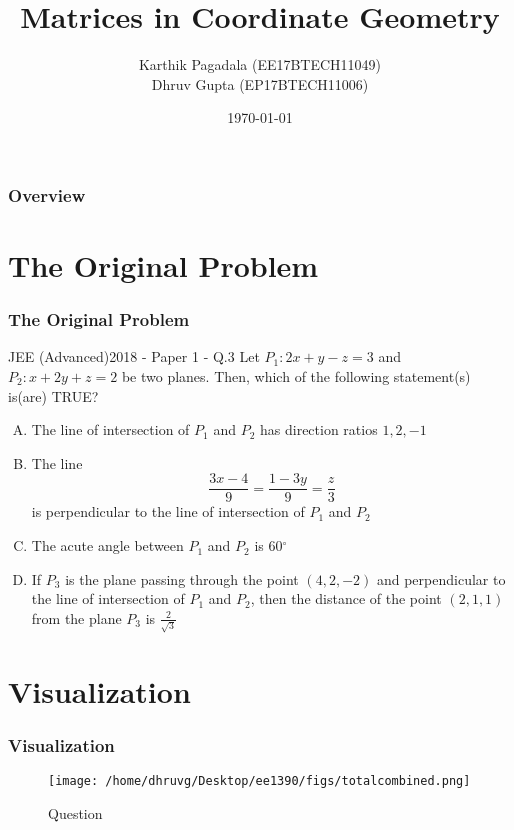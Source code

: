 \documentclass{beamer}
\title[Matrix Project]{Matrices in Coordinate Geometry}
\author{Karthik Pagadala (EE17BTECH11049)\\Dhruv Gupta (EP17BTECH11006)}
\institute[IITH] 
{
Indian Institute Of Technology Hyderabad \\
\medskip
EE1390 Matrix Project
}
\date{\today}
\begin{document}
 
\begin{frame}
\titlepage
\end{frame}
 
\begin{frame}
\frametitle{Overview}
\tableofcontents 
\end{frame}

\section{The Original Problem}
 
\begin{frame}
\frametitle{The Original Problem}
JEE (Advanced)2018 - Paper 1 - Q.3
\noindent\makebox[\linewidth]{\rule{\paperwidth}{0.4pt}}
Let $P_{1}: 2x + y - z = 3$ and $P_{2}: x + 2y + z = 2$ be two planes. Then, which of the following statement(s) is(are) TRUE?
\begin{enumerate}[(A)]
    \item The line of intersection of $P_{1}$ and $P_{2}$ has direction ratios $1,2,-1$
    \item The line
    \[
    \frac{3x-4}{9} = \frac{1-3y}{9}=\frac{z}{3}
    \]
    is perpendicular to the line of intersection of $P_{1}$ and $P_{2}$
    \item The acute angle between $P_{1}$ and $P_{2}$ is 60$^\circ$
    \item If $P_{3}$ is the plane passing through the point $(4,2,-2)$ and perpendicular to the line of intersection of $P_{1}$ and $P_{2}$, then the distance of the point $(2,1,1)$ from the plane $P_{3}$ is $\tfrac{2}{\sqrt{3}}$
\end{enumerate}
\end{frame}

 \section{Visualization}
 \begin{frame}
\frametitle{Visualization}
\begin{figure}[H]
    \texttt{[image: /home/dhruvg/Desktop/ee1390/figs/totalcombined.png]}
    \caption{Question}
    \label{D}
\end{figure}
\end{frame}

\end{document}

